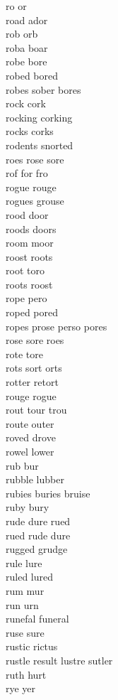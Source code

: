 ro or\\
road ador\\
rob orb\\
roba boar\\
robe bore\\
robed bored\\
robes sober bores\\
rock cork\\
rocking corking\\
rocks corks\\
rodents snorted\\
roes rose sore\\
rof for fro\\
rogue rouge\\
rogues grouse\\
rood door\\
roods doors\\
room moor\\
roost roots\\
root toro\\
roots roost\\
rope pero\\
roped pored\\
ropes prose perso pores\\
rose sore roes\\
rote tore\\
rots sort orts\\
rotter retort\\
rouge rogue\\
rout tour trou\\
route outer\\
roved drove\\
rowel lower\\
rub bur\\
rubble lubber\\
rubies buries bruise\\
ruby bury\\
rude dure rued\\
rued rude dure\\
rugged grudge\\
rule lure\\
ruled lured\\
rum mur\\
run urn\\
runefal funeral\\
ruse sure\\
rustic rictus\\
rustle result lustre sutler\\
ruth hurt\\
rye yer\\

